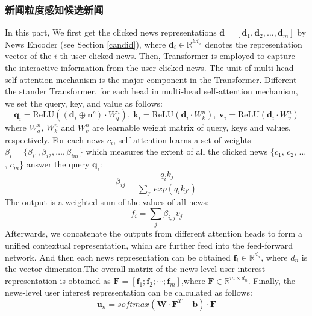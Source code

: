 \documentclass[withoutpreface,bwprint]{cumcmthesis} %
\begin{document}
	\subsubsection{ 新闻粒度感知候选新闻}
	In this part, 
	We first get the clicked news representations $\mathbf{d} = [\mathbf{d}_1, \mathbf{d}_2, \dots, \mathbf{d}_m]$ by News Encoder (see Section \ref{candid}), where $\mathbf{d}_i \in \mathbb{R}^{kd_w}$ denotes the representation vector of the $i$-th user clicked news.
	Then, Transformer is employed to capture the interactive information from the user clicked news.
	The unit of multi-head self-attention mechanism is the major component in the Transformer. 
	Different the stander Transformer, for each head in multi-head self-attention mechanism, we set the query, key, and value as follows:
	\begin{equation}\label{eatt}
	\mathbf{q}_{i} = \mathrm{ReLU}((\mathbf{d}_i \oplus \mathbf{n}^c) \cdot W^n_q),~ \mathbf{k}_{i} = \mathrm{ReLU}(\mathbf{d}_i \cdot W^n_k),~
	\mathbf{v}_{i} = \mathrm{ReLU}(\mathbf{d}_i \cdot W^n_v)
	\end{equation}
	where $W^n_q$, $W^n_k$ and $W^n_v$ are learnable weight matrix of query, keys and values, respectively. For each news $c_i$, self attention learns a set of weights $\beta_i = \{\beta_{i1}, \beta_{i2}, \dots, \beta_{im}\}$ which measures the extent of all the clicked news \{$c_1$, $c_2$, $\dots$, $c_m$\} answer the query $\mathbf{q}_i$:
	\begin{equation}
	\beta_{ij} = \frac{q_ik_j}{\sum_{j'}exp(q_ik_{j'})}
	\end{equation}
	The output is a weighted sum of the values of all news:
	\begin{equation}
	f_i = \sum_j \beta_{i,j}v_j
	\end{equation}
	Afterwards, we concatenate the outputs from different attention heads to form a unified contextual representation, which are further feed into the feed-forward network. And then each news representation can be obtained $\mathbf{f}_i \in \mathbb{R}^{d_n}$, where $d_n$ is the vector dimension.The overall matrix of the news-level user interest representation is obtained as $\mathbf{F}=[\mathbf{f}_1; \mathbf{f}_2; \cdots; \mathbf{f}_m]$,where $\mathbf{F} \in \mathbb{R}^{m \times d_n}$.
	Finally, the news-level user interest representation can be calculated as follows:
	\begin{equation}
	\mathbf{u}_n = softmax( \mathbf{W} \cdot \mathbf{F}^{T} + \mathbf{b}) \cdot \mathbf{F}
	\end{equation}
\end{document}
